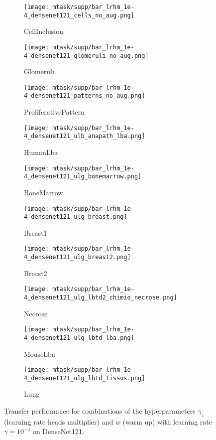 \begin{figure*}[h]
  \centering
  \begin{subfigure}{0.48\textwidth}
    \centering
    \texttt{[image: mtask/supp/bar\_lrhm\_1e-4\_densenet121\_cells\_no\_aug.png]}
    \caption{CellInclusion}
  \end{subfigure}
  \begin{subfigure}{0.48\textwidth}
    \centering
    \texttt{[image: mtask/supp/bar\_lrhm\_1e-4\_densenet121\_glomeruli\_no\_aug.png]}\\
    \caption{Glomeruli}
  \end{subfigure}
  \begin{subfigure}{0.48\textwidth}
    \centering
    \texttt{[image: mtask/supp/bar\_lrhm\_1e-4\_densenet121\_patterns\_no\_aug.png]}
    \caption{ProliferativePattern}
  \end{subfigure}
  \begin{subfigure}{0.48\textwidth}
    \centering
    \texttt{[image: mtask/supp/bar\_lrhm\_1e-4\_densenet121\_ulb\_anapath\_lba.png]}\\
    \caption{HumanLba}
  \end{subfigure}
  \begin{subfigure}{0.48\textwidth}
    \centering
    \texttt{[image: mtask/supp/bar\_lrhm\_1e-4\_densenet121\_ulg\_bonemarrow.png]}
    \caption{BoneMarrow}
  \end{subfigure}
  \begin{subfigure}{0.48\textwidth}
    \centering
    \texttt{[image: mtask/supp/bar\_lrhm\_1e-4\_densenet121\_ulg\_breast.png]}\\
    \caption{Breast1}
  \end{subfigure}
  \begin{subfigure}{0.48\textwidth}
    \centering
    \texttt{[image: mtask/supp/bar\_lrhm\_1e-4\_densenet121\_ulg\_breast2.png]}
    \caption{Breast2}
  \end{subfigure}
  \begin{subfigure}{0.48\textwidth}
    \centering
    \texttt{[image: mtask/supp/bar\_lrhm\_1e-4\_densenet121\_ulg\_lbtd2\_chimio\_necrose.png]}\\
    \caption{Necrose}
  \end{subfigure}
  \begin{subfigure}{0.48\textwidth}
    \centering
    \texttt{[image: mtask/supp/bar\_lrhm\_1e-4\_densenet121\_ulg\_lbtd\_lba.png]}
    \caption{MouseLba}
  \end{subfigure}
  \begin{subfigure}{0.48\textwidth}
    \centering
    \texttt{[image: mtask/supp/bar\_lrhm\_1e-4\_densenet121\_ulg\_lbtd\_tissus.png]}
    \caption{Lung}
  \end{subfigure}
  \caption{Transfer performance for combinations of the hyperparameters $\gamma_\tau$ (learning rate heads multiplier) and $w$ (warm up) with learning rate $\gamma = 10^{-4}$ on DenseNet121.}
  \label{app:mtask:fig:bar_lrhm_densenet}
\end{figure*}

